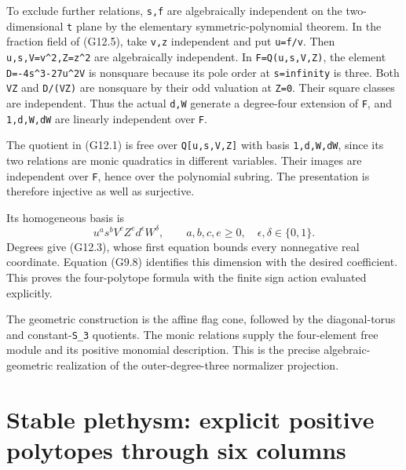 \documentclass[
  10pt,
]{article}
\begin{document}
To exclude further relations, \texttt{\small s,\allowbreak{}f} are
algebraically independent on the two-dimensional \texttt{\small t} plane
by the elementary symmetric-polynomial theorem. In the fraction field of
(G12.5), take \texttt{\small v,\allowbreak{}z} independent and put
\texttt{\small u=\allowbreak{}f/\allowbreak{}v}. Then
\texttt{\small u,\allowbreak{}s,\allowbreak{}V=\allowbreak{}v\textasciicircum{}2,\allowbreak{}Z=\allowbreak{}z\textasciicircum{}2}
are algebraically independent. In
\texttt{\small F=\allowbreak{}Q(\allowbreak{}u,\allowbreak{}s,\allowbreak{}V,\allowbreak{}Z)\allowbreak{}},
the element
\texttt{\small D=\allowbreak{}-\allowbreak{}4s\textasciicircum{}3-\allowbreak{}27u\textasciicircum{}2V}
is nonsquare because its pole order at
\texttt{\small s=\allowbreak{}infinity} is three. Both
\texttt{\small VZ} and
\texttt{\small D/\allowbreak{}(\allowbreak{}VZ)\allowbreak{}} are
nonsquare by their odd valuation at \texttt{\small Z=\allowbreak{}0}.
Their square classes are independent. Thus the actual
\texttt{\small d,\allowbreak{}W} generate a degree-four extension of
\texttt{\small F}, and
\texttt{\small 1,\allowbreak{}d,\allowbreak{}W,\allowbreak{}dW} are
linearly independent over \texttt{\small F}.

The quotient in (G12.1) is free over
\texttt{\small Q[\allowbreak{}u,\allowbreak{}s,\allowbreak{}V,\allowbreak{}Z]\allowbreak{}}
with basis
\texttt{\small 1,\allowbreak{}d,\allowbreak{}W,\allowbreak{}dW}, since
its two relations are monic quadratics in different variables. Their
images are independent over \texttt{\small F}, hence over the polynomial
subring. The presentation is therefore injective as well as surjective.

Its homogeneous basis is \[
u^a s^b V^c Z^e d^\epsilon W^\delta,
\qquad a,b,c,e\ge0,\quad\epsilon,\delta\in\{0,1\}.
\] Degrees give (G12.3), whose first equation bounds every nonnegative
real coordinate. Equation (G9.8) identifies this dimension with the
desired coefficient. This proves the four-polytope formula with the
finite sign action evaluated explicitly.

The geometric construction is the affine flag cone, followed by the
diagonal-torus and constant-\texttt{\small S\_\allowbreak{}3} quotients.
The monic relations supply the four-element free module and its positive
monomial description. This is the precise algebraic-geometric
realization of the outer-degree-three normalizer projection.

\section{Stable plethysm: explicit positive polytopes through six
columns}\label{stable-plethysm-explicit-positive-polytopes-through-six-columns}
\end{document}
